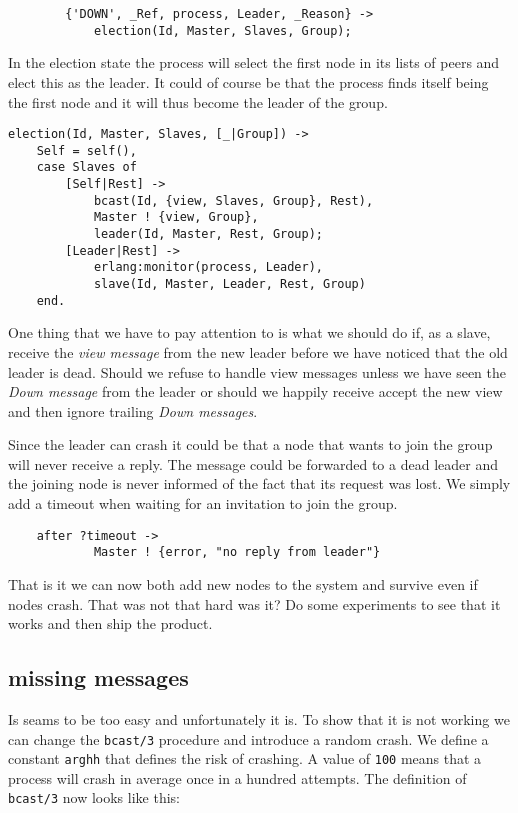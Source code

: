 \documentclass[a4paper,11pt]{article}
\begin{document}
\begin{verbatim}
        {'DOWN', _Ref, process, Leader, _Reason} ->
            election(Id, Master, Slaves, Group);
\end{verbatim}


In the election state the process will select the first node in its
lists of peers and elect this as the leader. It could of course be
that the process finds itself being the first node and it will thus
become the leader of the group.

\begin{verbatim}
election(Id, Master, Slaves, [_|Group]) ->
    Self = self(),
    case Slaves of
        [Self|Rest] ->
            bcast(Id, {view, Slaves, Group}, Rest),
            Master ! {view, Group},
            leader(Id, Master, Rest, Group);
        [Leader|Rest] ->
            erlang:monitor(process, Leader),
            slave(Id, Master, Leader, Rest, Group)
    end.
\end{verbatim}

One thing that we have to pay attention to is what we should do if, as
a slave, receive the {\em view message} from the new leader before we
have noticed that the old leader is dead. Should we refuse to handle
view messages unless we have seen the {\em Down message} from the
leader or should we happily receive accept the new view and then
ignore trailing {\em Down messages}.


Since the leader can crash it could be that a node that wants to join
the group will never receive a reply. The message could be forwarded
to a dead leader and the joining node is never informed of the fact
that its request was lost. We simply add a timeout when waiting for an
invitation to join the group.

\begin{verbatim}
    after ?timeout ->
            Master ! {error, "no reply from leader"}
\end{verbatim}

That is it we can now both add new nodes to the system and survive
even if nodes crash. That was not that hard was it? Do some
experiments to see that it works and then ship the product.

\subsection{missing messages}

Is seams to be too easy and unfortunately it is. To show that it is
not working we can change the {\tt bcast/3} procedure and introduce a
random crash. We define a constant {\tt arghh} that defines the risk
of crashing. A value of {\tt 100} means that a process will crash in
average once in a hundred attempts. The definition of {\tt bcast/3}
now looks like this:
\end{document}
